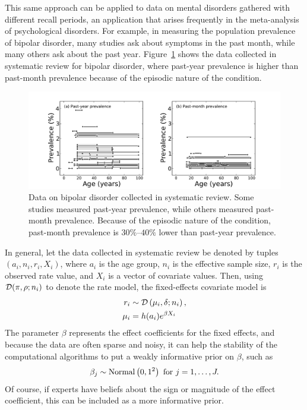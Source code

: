 This same approach can be applied to data on mental disorders
gathered with different recall periods, an application that arises
frequently in the meta-analysis of psychological disorders.  For
example, in measuring the population prevalence of bipolar disorder,
many studies ask about symptoms in the past month,
while many others ask about the past year.
Figure~\ref{bipolar-data-cv} shows the data collected in systematic
review for bipolar disorder, where past-year prevalence is higher than
past-month prevalence because of the episodic nature of the
condition.

\begin{figure}[h]
\begin{center}
\includegraphics[width=\textwidth]{bipolar-data-by-cv.pdf}
\caption[Data on bipolar disorder collected in systematic review.]{Data 
  on bipolar disorder collected in systematic review.
  Some studies measured past-year prevalence, while others measured
  past-month prevalence.  Because of the episodic nature of the
  condition, past-month prevalence is $30\%$--$40\%$ lower than past-year prevalence.}
\label{bipolar-data-cv}
\end{center}
\end{figure}


In general, let the data collected in systematic review be denoted by
tuples $\left(a_i, n_i, r_i, X_i\right)$, where $a_i$ is the
age group, $n_i$ is the effective sample size, $r_i$ is the observed rate
value, and $X_i$ is a vector of covariate values. Then, using
$\mathcal{D}(\pi, \rho; n_i)$ to denote the rate model, the fixed-effects
covariate model is
\begin{align*}
r_i &\sim \mathcal{D}\left(\mu_i, \delta; n_i\right),\\
\mu_i &= h(a_i)e^{\beta X_i}
\end{align*}
The parameter $\beta$ represents the effect coefficients for
the fixed effects, and because the data are often sparse and noisy, it
can help the stability of the computational algorithms to put a weakly
informative prior on $\beta$, such as
\[
\beta_j \sim \operatorname{Normal}\left(0, 1^2\right) \text{ for } j = 1, \ldots, J.
\]
Of course, if experts have beliefs about the sign or magnitude of the
effect coefficient, this can be included as a more informative prior.


